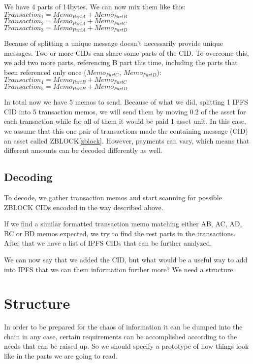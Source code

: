 \documentclass[10pt,a4paper,twocolumn]{paper}
\begin{document}
	We have 4 parts of 14bytes. We can now mix them like this:\\
	$Transaction_{1} = Memo_{PartA}+Memo_{PartB}$\\
	$Transaction_{2} = Memo_{PartA}+Memo_{PartC}$\\
	$Transaction_{3} = Memo_{PartA}+Memo_{PartD}$

	Because of splitting a unique message doesn't necessarily provide unique messages. Two or more CIDs can share some parts of the CID. To overcome this, we add two more parts, referencing B part this time, including the parts that been referenced only once ($Memo_{PartC}$, $Memo_{PartD}$):\\
	$Transaction_{4} = Memo_{PartB}+Memo_{PartC}$\\
	$Transaction_{5} = Memo_{PartB}+Memo_{PartD}$
	
	In total now we have 5 memos to send. Because of what we did, splitting 1 IPFS CID into 5 transaction memos, we will send them by moving 0.2 of the asset for each transaction while for all of them it would be paid 1 asset unit. In this case, we assume that this one pair of transactions made the containing message (CID) an asset called ZBLOCK\ref{zblock}. However, payments can vary, which means that different amounts can be decoded differently as well.
	
	
	\subsection{Decoding}\label{decoding}
	
	To decode, we gather transaction memos and start scanning for possible ZBLOCK CIDs encoded in the way described above.
	
	If we find a similar formatted transaction memo matching either AB, AC, AD, BC or BD memos expected, we try to find the rest parts in the transactions. After that we have a list of IPFS CIDs that can be further analyzed.
	
	We can now say that we added the CID, but what would be a useful way to add into IPFS that we can them information further more? We need a structure.
	
	\section{Structure}\label{structure}

	In order to be prepared for the chaos of information it can be dumped into the chain in any case, certain requirements can be accomplished according to the needs that can be raised up. So we should specify a prototype of how things look like in the parts we are going to read.
	
\end{document}
